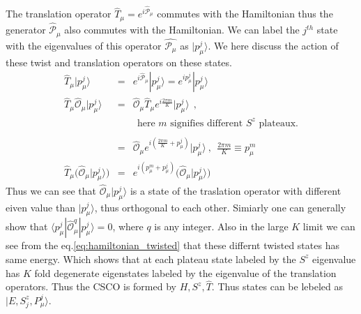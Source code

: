 \documentclass[reprint,prb,superscriptaddress]{revtex4-1}
\begin{document}
\noindent The translation operator $\hat{T}_{\mu}=e^{i\hat{\mathcal{P}}_{\mu}}$ commutes with the Hamiltonian thus the generator $\hat{\mathcal{P}}_{\mu}$ also commutes with the Hamiltonian. We can label the $j^{th}$ state with the eigenvalues of this operator $\hat{\mathcal{P}_{\mu}}$ as $|p^{j}_{\mu}\rangle$. We here discuss the action of these twist and translation operators on these states.
\begin{eqnarray}
\hat{T}_{\mu} |p^j_{\mu} \rangle &=& e^{i\hat{\mathcal{P}}_{\mu}} |p^j_{\mu} \rangle = e^{ip^j_{\mu}} |p^j_{\mu}\rangle \nonumber\\
\hat{T}_{\mu} \hat{\mathcal{O}}_{\mu} |p^j_{\mu} \rangle &=&  \hat{\mathcal{O}}_{\mu} \hat{T}_{\mu} e^{i\frac{2\pi m}{K}} |p^j_{\mu}\rangle~~, \nonumber\\
&&~~\textrm{here $m$ signifies different $S^z$ plateaux.} \nonumber\\ \nonumber\\
&=& \hat{\mathcal{O}}_{\mu}   e^{i(\frac{2\pi m}{K}+p_{\mu}^j)} |p^j_{\mu}\rangle~,~~ \frac{2\pi m}{K} \equiv p_{\mu}^{m} \nonumber\\
\hat{T}_{\mu} \bigg( \hat{\mathcal{O}}_{\mu} |p^j_{\mu} \rangle  \bigg) &=& e^{i(p_{\mu}^{m}+p_{\mu}^j)} \bigg( \hat{\mathcal{O}}_{\mu}    |p^j_{\mu}\rangle \bigg)    
\end{eqnarray}
Thus we can see that  $\hat{\mathcal{O}}_{\mu} |p^j_{\mu} \rangle $ is a state of the traslation operator with different eiven value than $|p^j_{\mu} \rangle $, thus orthogonal to each other. Simiarly one can generally show that $\langle p^j_{\mu} | \hat{\mathcal{O}}^{q}_{\mu} |p^j_{\mu} \rangle=0$, where $q$ is any integer. Also in the large $K$ limit we can see from the eq.\eqref{eq:hamiltonian_twisted} that these differnt twisted states has same energy. Which shows that at each plateau state labeled by the $S^z$ eigenvalue has $K$ fold degenerate eigenstates labeled by the eigenvalue of the translation operators. Thus the CSCO is formed by $H,S^z,\hat{T}$. Thus states can be lebeled as  $|E,S^z_j,P^j_{\mu}\rangle$. 
\end{document}
